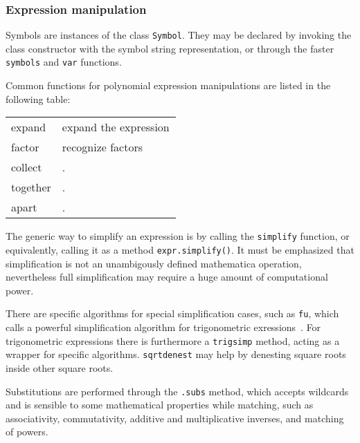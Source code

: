 
\subsubsection{Expression manipulation}


Symbols are instances of the class \texttt{Symbol}.
They may be declared by invoking the class constructor with the symbol string
representation, or through the faster \texttt{symbols} and \texttt{var}
functions.



Common functions for polynomial expression manipulations are listed in the
following table:
\begin{tabular}{l|p{0.7\linewidth}}
expand & expand the expression \\
factor & recognize factors \\
collect & . \\
together & . \\
apart & . \\
\end{tabular}


The generic way to simplify an expression is by calling the \texttt{simplify}
function, or equivalently, calling it as a method \texttt{expr.simplify()}.
It must be emphasized that simplification is not an unambigously defined
mathematica operation, nevertheless full simplification may require a huge
amount of computational power.

There are specific algorithms for special simplification cases,
such as \texttt{fu}, which calls a powerful simplification algorithm for
trigonometric exressions~\cite{fu2006automated}.
For trigonometric expressions there is furthermore a \texttt{trigsimp} method,
acting as a wrapper for specific algorithms.
\texttt{sqrtdenest} may help by denesting square roots inside other square roots.



Substitutions are performed through the \texttt{.subs} method, which accepts
wildcards and is sensible to some mathematical properties while matching,
such as associativity, commutativity,  additive and multiplicative inverses,
and matching of powers.

